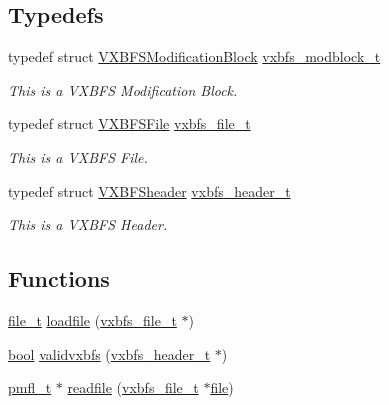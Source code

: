 \subsection*{Typedefs}
\begin{DoxyCompactItemize}
\item 
typedef struct \hyperlink{a00332}{V\+X\+B\+F\+S\+Modification\+Block} \hyperlink{a00206_a0774a42f7a124b6d3054ccabd4d35463_a0774a42f7a124b6d3054ccabd4d35463}{vxbfs\+\_\+modblock\+\_\+t}
\begin{DoxyCompactList}\small\item\em This is a V\+X\+B\+FS Modification Block. \end{DoxyCompactList}\item 
typedef struct \hyperlink{a00336}{V\+X\+B\+F\+S\+File} \hyperlink{a00206_abb93e2407af0d8fe0f5629ce6456c6f9_abb93e2407af0d8fe0f5629ce6456c6f9}{vxbfs\+\_\+file\+\_\+t}
\begin{DoxyCompactList}\small\item\em This is a V\+X\+B\+FS File. \end{DoxyCompactList}\item 
typedef struct \hyperlink{a00340}{V\+X\+B\+F\+Sheader} \hyperlink{a00206_ac5678b6d5dd5ed5ca86e5ccd4c30d39d_ac5678b6d5dd5ed5ca86e5ccd4c30d39d}{vxbfs\+\_\+header\+\_\+t}
\begin{DoxyCompactList}\small\item\em This is a V\+X\+B\+FS Header. \end{DoxyCompactList}\end{DoxyCompactItemize}
\subsection*{Functions}
\begin{DoxyCompactItemize}
\item 
\hyperlink{a00191_aa5445a6474a23ee3e7756d432dfa4ba1_aa5445a6474a23ee3e7756d432dfa4ba1}{file\+\_\+t} \hyperlink{a00206_a056a7e9a594275f19bd99150a92f266a_a056a7e9a594275f19bd99150a92f266a}{loadfile} (\hyperlink{a00206_abb93e2407af0d8fe0f5629ce6456c6f9_abb93e2407af0d8fe0f5629ce6456c6f9}{vxbfs\+\_\+file\+\_\+t} $\ast$)
\item 
\hyperlink{a00140_af6a258d8f3ee5206d682d799316314b1_af6a258d8f3ee5206d682d799316314b1}{bool} \hyperlink{a00206_a4d38ed022dd74a1ef381240419f8fd72_a4d38ed022dd74a1ef381240419f8fd72}{validvxbfs} (\hyperlink{a00206_ac5678b6d5dd5ed5ca86e5ccd4c30d39d_ac5678b6d5dd5ed5ca86e5ccd4c30d39d}{vxbfs\+\_\+header\+\_\+t} $\ast$)
\item 
\hyperlink{a00191_a02f7eedc7de6c770b6b29a62905fc61d_a02f7eedc7de6c770b6b29a62905fc61d}{pmfl\+\_\+t} $\ast$ \hyperlink{a00206_a092e5bdd19e8369aa33901fffeb1f025_a092e5bdd19e8369aa33901fffeb1f025}{readfile} (\hyperlink{a00206_abb93e2407af0d8fe0f5629ce6456c6f9_abb93e2407af0d8fe0f5629ce6456c6f9}{vxbfs\+\_\+file\+\_\+t} $\ast$\hyperlink{a00308}{file})
\end{DoxyCompactItemize}


